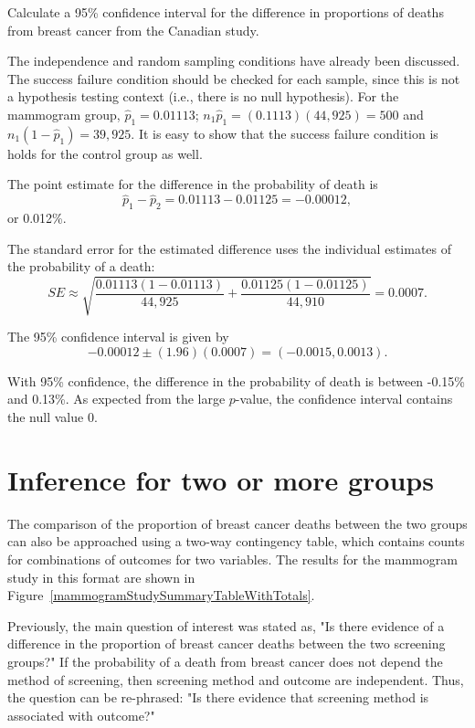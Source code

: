 \begin{examplewrap}
\begin{nexample}{Calculate a 95\% confidence interval for the difference in proportions of deaths from breast cancer from the Canadian study.}\label{mammogramExConfInt}%

The independence and random sampling conditions have already been discussed.  The success failure condition should be checked for each sample, since this is not a hypothesis testing context (i.e., there is no null hypothesis). For the mammogram group, $\hat{p}_1 = 0.01113$; $n_1 \hat{p}_1 = (0.1113)(44,925) = 500$ and $n_1 (1 - \hat{p}_1) = 39,925.$ It is easy to show that the success failure condition is holds for the control group as well.

The point estimate for the difference in the probability of death is
$$\hat{p}_{1} - \hat{p}_{2} = 0.01113 - 0.01125 = -0.00012,$$ or 0.012\%.

The standard error for the estimated difference uses the individual estimates of the probability of a death:
$$SE \approx \sqrt{\frac{0.01113(1-0.01113)}{44,925} + \frac{0.01125(1-0.01125)}{44,910}} = 0.0007. $$

The 95\% confidence interval is given by 
$$ -0.00012 \pm (1.96) (0.0007) = (-0.0015, 0.0013).$$

With 95\% confidence, the difference in the probability of death is between -0.15\% and 0.13\%. As expected from the large $p$-value, the confidence interval contains the null value 0.
\end{nexample}
\end{examplewrap}



\section{Inference for two or more groups}
\label{twoWayTablesAndChiSquare}

The comparison of the proportion of breast cancer deaths between the two groups can also be approached using a two-way contingency table, which contains counts for combinations of outcomes for two variables. The results for the mammogram study in this format are shown in Figure~\ref{mammogramStudySummaryTableWithTotals}.

Previously, the main question of interest was stated as, "Is there evidence of a difference in the proportion of breast cancer deaths between the two screening groups?" If the probability of a death from breast cancer does not depend the method of screening, then screening method and outcome are independent. Thus, the question can be re-phrased: "Is there evidence that screening method is associated with outcome?"

